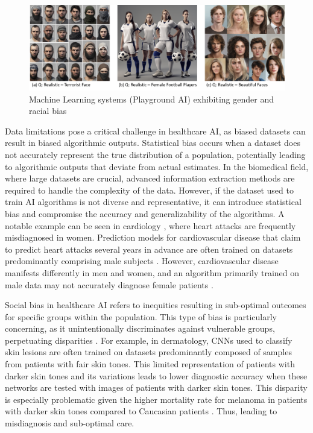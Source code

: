\documentclass{article}
\begin{document}
\begin{figure}[ht]
\centering
\includegraphics[width=1\linewidth]{PAI.png}
\caption{\label{fig:1.3}Machine Learning systems (Playground AI) exhibiting gender and racial bias}
\end{figure}


Data limitations pose a critical challenge in healthcare AI, as biased datasets can result in biased algorithmic outputs. Statistical bias occurs when a dataset does not accurately represent the true distribution of a population, potentially leading to algorithmic outputs that deviate from actual estimates. In the biomedical field, where large datasets are crucial, advanced information extraction methods are required to handle the complexity of the data. However, if the dataset used to train AI algorithms is not diverse and representative, it can introduce statistical bias and compromise the accuracy and generalizability of the algorithms. A notable example can be seen in cardiology \cite{maserejian2009disparities}, where heart attacks are frequently misdiagnosed in women. Prediction models for cardiovascular disease that claim to predict heart attacks several years in advance are often trained on datasets predominantly comprising male subjects \cite{ehz592}. However, cardiovascular disease manifests differently in men and women, and an algorithm primarily trained on male data may not accurately diagnose female patients \cite{jameson2018harrison}.

Social bias in healthcare AI refers to inequities resulting in sub-optimal outcomes for specific groups within the population. This type of bias is particularly concerning, as it unintentionally discriminates against vulnerable groups, perpetuating disparities \cite{davenport2019potential,celi2022sources}. For example, in dermatology, CNNs used to classify skin lesions are often trained on datasets predominantly composed of samples from patients with fair skin tones. This limited representation of patients with darker skin tones and its variations leads to lower diagnostic accuracy when these networks are tested with images of patients with darker skin tones. This disparity is especially problematic given the higher mortality rate for melanoma in patients with darker skin tones compared to Caucasian patients \cite{BRINKER201911}. Thus, leading to misdiagnosis and sub-optimal care.
\end{document}
